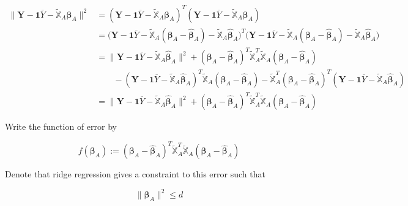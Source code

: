 \documentclass[]{book}
\theoremstyle{definition}
\theoremstyle{definition}
\theoremstyle{definition}
\theoremstyle{remark}
\begin{document}
\begin{equation*}
  \begin{split}
    \lVert \mathbf{Y} - \mathbf{1} \overline{Y} - \widetilde{\mathbb{X}}_A \boldsymbol\beta_A \rVert^2 & = (\mathbf{Y} - \mathbf{1} \overline{Y} - \widetilde{\mathbb{X}}_A \boldsymbol\beta_A)^T (\mathbf{Y} - \mathbf{1} \overline{Y} - \widetilde{\mathbb{X}}_A \boldsymbol\beta_A) \\
    & = \Big(\mathbf{Y} - \mathbf{1} \overline{Y} - \widetilde{\mathbb{X}}_A (\boldsymbol\beta_A - \boldsymbol{\hat\beta}_{A}) - \widetilde{\mathbb{X}}_A \boldsymbol{\hat\beta}_{A} \Big)^T \Big(\mathbf{Y} - \mathbf{1} \overline{Y} - \widetilde{\mathbb{X}}_A (\boldsymbol\beta_A - \boldsymbol{\hat\beta}_{A}) - \widetilde{\mathbb{X}}_A \boldsymbol{\hat\beta}_{A} \Big) \\
    & = \lVert \mathbf{Y} - \mathbf{1} \overline{Y} - \widetilde{\mathbb{X}}_A \boldsymbol{\hat\beta}_{A} \rVert^2 + (\boldsymbol\beta_A - \boldsymbol{\hat\beta}_{A})^T \widetilde{\mathbb{X}}_A^T \widetilde{\mathbb{X}}_A (\boldsymbol\beta_A - \boldsymbol{\hat\beta}_{A}) \\
    & \qquad - (\mathbf{Y} - \mathbf{1} \overline{Y} - \widetilde{\mathbb{X}}_A \boldsymbol{\hat\beta}_{A})^T \widetilde{\mathbb{X}}_A (\boldsymbol\beta_A - \boldsymbol{\hat\beta}_{A}) - \widetilde{\mathbb{X}}_A^T (\boldsymbol\beta_A - \boldsymbol{\hat\beta}_{A})^T (\mathbf{Y} - \mathbf{1} \overline{Y} - \widetilde{\mathbb{X}}_A \boldsymbol{\hat\beta}_{A}) \\
    & = \lVert \mathbf{Y} - \mathbf{1} \overline{Y} - \widetilde{\mathbb{X}}_A \boldsymbol{\hat\beta}_{A} \rVert^2 + (\boldsymbol\beta_A - \boldsymbol{\hat\beta}_{A})^T \widetilde{\mathbb{X}}_A^T \widetilde{\mathbb{X}}_A (\boldsymbol\beta_A - \boldsymbol{\hat\beta}_{A})
  \end{split}
\end{equation*}

Write the function of error by

\begin{equation}
  f(\boldsymbol\beta_A) := (\boldsymbol\beta_A - \boldsymbol{\hat\beta}_{A})^T \widetilde{\mathbb{X}}_A^T \widetilde{\mathbb{X}}_A (\boldsymbol\beta_A - \boldsymbol{\hat\beta}_{A})
  \label{eq:olsfn}
\end{equation}

Denote that ridge regression gives a constraint to this error such that

\[\lVert \boldsymbol\beta_A \rVert^2 \le d\]
\end{document}
